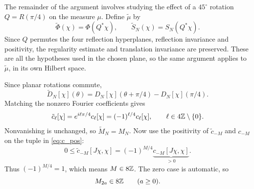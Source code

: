 The remainder of the argument involves studying the effect of a
$45^\circ$ rotation $Q=R(\pi/4)$ on the measure $\mu$. Define
$\tilde\mu$ by
\begin{equation}
 \tilde\Phi(\chi)=\Phi(Q^*\chi),\qquad
 \tilde S_N(\chi)=S_N(Q^*\chi).
\end{equation}
Since $Q$ permutes the four reflection hyperplanes,
reflection invariance and positivity, the regularity estimate and
translation invariance are preserved. These are all the hypotheses
used in the chosen plane, so the same argument applies to
$\tilde\mu$, in its own Hilbert space.

Since planar rotations commute,
\begin{equation}
 \tilde D_N[\chi](\theta)
       =D_N[\chi](\theta+\pi/4)-D_N[\chi](\pi/4).
\end{equation}
Matching the nonzero Fourier coefficients gives
\begin{equation}\label{eq:tilt-coefficient}
 \tilde c_\ell[\chi]=e^{i\ell\pi/4}c_\ell[\chi]
                  =(-1)^{\ell/4}c_\ell[\chi],
 \qquad\ell\in4\mathbb{Z}\setminus\{0\}.
\end{equation}
Nonvanishing is unchanged, so $\tilde M_N=M_N$.
Now use the positivity of $\tilde c_{-M}$ and $c_{-M}$ on the tuple
in \eqref{eq:c_pos}:
\begin{equation}
 0\leq\tilde c_{-M}[J\chi,\chi]
     =(-1)^{M/4}\underbrace{c_{-M}[J\chi,\chi]}_{>0}.
\end{equation}
Thus $(-1)^{M/4}=1$, which means $M\in8\mathbb{Z}$.
The zero case is automatic, so
\begin{equation}\label{eq:8}
 M_{2a}\in8\mathbb{Z}\qquad(a\geq0).
\end{equation}

